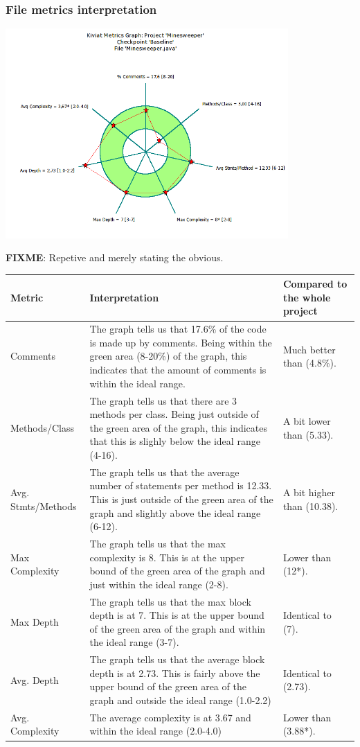 \documentclass[UKenglish]{article}  %
\begin{document}
\subsubsection{File metrics interpretation}

\includegraphics[height=8cm]{Minesweeper_java-kiviat-metrics-graph-original.png}

\textbf{FIXME}: Repetive and merely stating the obvious.

\begin{longtable}[H]{| m{2cm} |  m{10cm} | m{4cm} |}
	\hline
	\textbf{Metric} & \textbf{Interpretation} & \textbf{Compared to the whole project}\\
	\hline
	Comments &
	The graph tells us that 17.6\% of the code is made up by comments.
	Being within the green area (8-20\%) of the graph, this indicates that
	the amount of comments is within the ideal range. &
	Much better than (4.8\%).\\
	\hline
	Methods/Class &
	The graph tells us that there are 3 methods per class.
	Being just outside of the green area of the graph, this indicates
	that this is slighly below the ideal range (4-16). &
	A bit lower than (5.33).\\
	\hline
	Avg. Stmts/Methods &
	The graph tells us that the average number of statements per method is
	12.33.
	This is just outside of the green area of the graph and slightly above
	the ideal range	(6-12). &
	A bit higher than (10.38).\\
	\hline
	Max Complexity &
	The graph tells us that the max complexity is 8.
	This is at the upper bound of the green area of the graph and just
	within the ideal range (2-8). &
	Lower than (12*).\\
	\hline
	Max Depth &
	The graph tells us that the max block depth is at 7.
	This is at the upper bound of the green area of the graph and within
	the ideal range (3-7). &
	Identical to (7).\\
	\hline
	Avg. Depth &
	The graph tells us that the average block depth is at 2.73.
	This is fairly above the upper bound of the green area of the graph
	and outside the ideal range (1.0-2.2) &
	Identical to (2.73).\\
	\hline
	Avg. Complexity &
	The average complexity is at 3.67 and within the ideal range (2.0-4.0) &
	Lower than (3.88*).\\
	\hline
\end{longtable}
\end{document}
